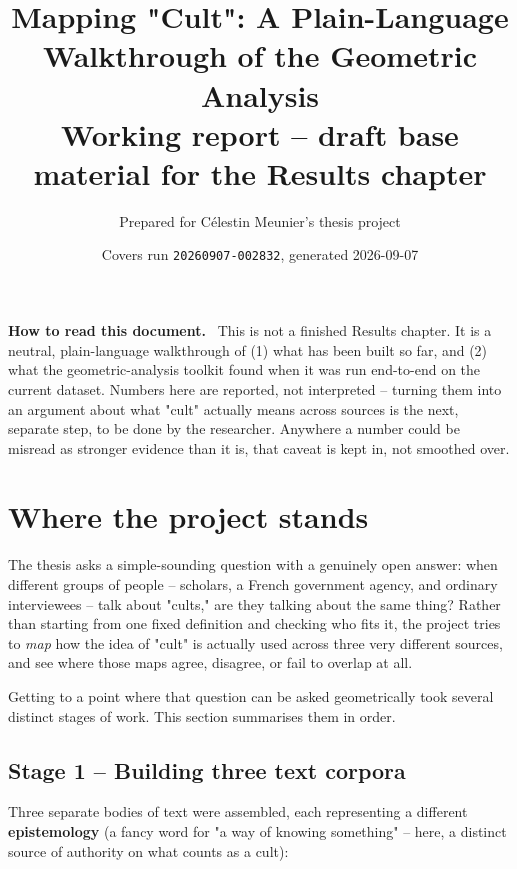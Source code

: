 \documentclass[11pt,a4paper]{article}
\title{\textbf{Mapping "Cult": A Plain-Language Walkthrough of the Geometric Analysis}\\[4pt]
\large Working report -- draft base material for the Results chapter}
\author{Prepared for C\'elestin Meunier's thesis project}
\date{Covers run \texttt{20260907-002832}, generated 2026-09-07}
\newenvironment{plainbox}[1][Note]
  {\par\vspace{6pt}\noindent{\color{noteline}\rule{\linewidth}{0.6pt}}\par\vspace{3pt}
   \noindent\small\textbf{#1.}\ \ignorespaces}
  {\par\vspace{3pt}\noindent{\color{noteline}\rule{\linewidth}{0.6pt}}\vspace{6pt}\par}
\newcommand{\jargon}[1]{\textbf{#1}}
\begin{document}
\maketitle

\begin{plainbox}[How to read this document]
This is not a finished Results chapter. It is a neutral, plain-language
walkthrough of (1) what has been built so far, and (2) what the
geometric-analysis toolkit found when it was run end-to-end on the
current dataset. Numbers here are reported, not interpreted -- turning
them into an argument about what "cult" actually means across sources
is the next, separate step, to be done by the researcher. Anywhere a
number could be misread as stronger evidence than it is, that caveat is
kept in, not smoothed over.
\end{plainbox}

\tableofcontents

\section{Where the project stands}

The thesis asks a simple-sounding question with a genuinely open answer:
when different groups of people -- scholars, a French government agency,
and ordinary interviewees -- talk about "cults," are they talking about
the same thing? Rather than starting from one fixed definition and
checking who fits it, the project tries to \emph{map} how the idea of
"cult" is actually used across three very different sources, and see
where those maps agree, disagree, or fail to overlap at all.

Getting to a point where that question can be asked geometrically took
several distinct stages of work. This section summarises them in order.

\subsection{Stage 1 -- Building three text corpora}
Three separate bodies of text were assembled, each representing a
different \jargon{epistemology} (a fancy word for "a way of knowing
something" -- here, a distinct source of authority on what counts as a
cult):
\end{document}
